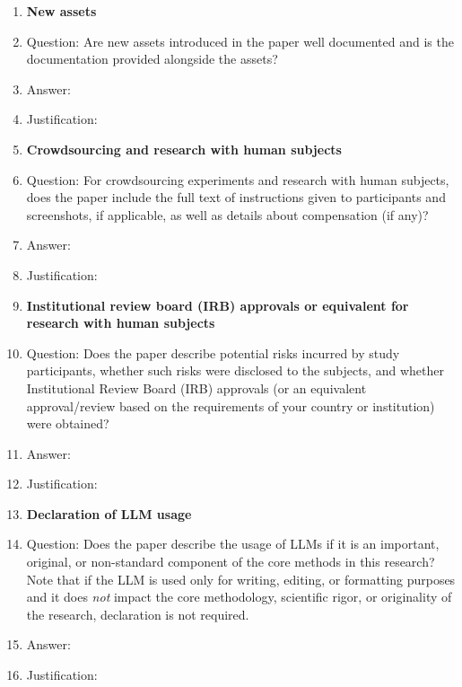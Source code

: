 \begin{enumerate}
\item {\bf New assets}
    \item[] Question: Are new assets introduced in the paper well documented and is the documentation provided alongside the assets?
    \item[] Answer: \answerNA{}
    \item[] Justification: 

\item {\bf Crowdsourcing and research with human subjects}
    \item[] Question: For crowdsourcing experiments and research with human subjects, does the paper include the full text of instructions given to participants and screenshots, if applicable, as well as details about compensation (if any)?
    \item[] Answer: \answerNA{}
    \item[] Justification: 

\item {\bf Institutional review board (IRB) approvals or equivalent for research with human subjects}
    \item[] Question: Does the paper describe potential risks incurred by study participants, whether such risks were disclosed to the subjects, and whether Institutional Review Board (IRB) approvals (or an equivalent approval/review based on the requirements of your country or institution) were obtained?
    \item[] Answer: \answerNA{}
    \item[] Justification: 

\item {\bf Declaration of LLM usage}
    \item[] Question: Does the paper describe the usage of LLMs if it is an important, original, or non-standard component of the core methods in this research? Note that if the LLM is used only for writing, editing, or formatting purposes and it does \emph{not} impact the core methodology, scientific rigor, or originality of the research, declaration is not required.
    \item[] Answer: \answerNo{}
    \item[] Justification: 

\end{enumerate}
